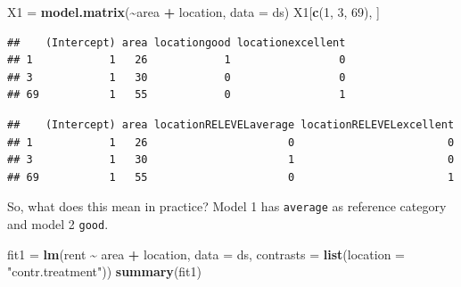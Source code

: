 \documentclass[
]{article}
\newenvironment{Shaded}{\begin{snugshade}}{\end{snugshade}}
\newcommand{\AttributeTok}[1]{\textcolor[rgb]{0.13,0.29,0.53}{#1}}
\newcommand{\DecValTok}[1]{\textcolor[rgb]{0.00,0.00,0.81}{#1}}
\newcommand{\FunctionTok}[1]{\textcolor[rgb]{0.13,0.29,0.53}{\textbf{#1}}}
\newcommand{\NormalTok}[1]{#1}
\newcommand{\OtherTok}[1]{\textcolor[rgb]{0.56,0.35,0.01}{#1}}
\newcommand{\SpecialCharTok}[1]{\textcolor[rgb]{0.81,0.36,0.00}{\textbf{#1}}}
\newcommand{\StringTok}[1]{\textcolor[rgb]{0.31,0.60,0.02}{#1}}
\begin{document}
\begin{Shaded}
\begin{Highlighting}[]
\NormalTok{X1 }\OtherTok{=} \FunctionTok{model.matrix}\NormalTok{(}\SpecialCharTok{\textasciitilde{}}\NormalTok{area }\SpecialCharTok{+}\NormalTok{ location, }\AttributeTok{data =}\NormalTok{ ds)}
\NormalTok{X1[}\FunctionTok{c}\NormalTok{(}\DecValTok{1}\NormalTok{, }\DecValTok{3}\NormalTok{, }\DecValTok{69}\NormalTok{), ]}
\end{Highlighting}
\end{Shaded}

\begin{verbatim}
##    (Intercept) area locationgood locationexcellent
## 1            1   26            1                 0
## 3            1   30            0                 0
## 69           1   55            0                 1
\end{verbatim}

\begin{Shaded}
\end{Shaded}

\begin{verbatim}
##    (Intercept) area locationRELEVELaverage locationRELEVELexcellent
## 1            1   26                      0                        0
## 3            1   30                      1                        0
## 69           1   55                      0                        1
\end{verbatim}

So, what does this mean in practice? Model 1 has \texttt{average} as
reference category and model 2 \texttt{good}.

\begin{Shaded}
\begin{Highlighting}[]
\NormalTok{fit1 }\OtherTok{=} \FunctionTok{lm}\NormalTok{(rent }\SpecialCharTok{\textasciitilde{}}\NormalTok{ area }\SpecialCharTok{+}\NormalTok{ location, }\AttributeTok{data =}\NormalTok{ ds, }\AttributeTok{contrasts =} \FunctionTok{list}\NormalTok{(}\AttributeTok{location =} \StringTok{"contr.treatment"}\NormalTok{))}
\FunctionTok{summary}\NormalTok{(fit1)}
\end{Highlighting}
\end{Shaded}
\end{document}
